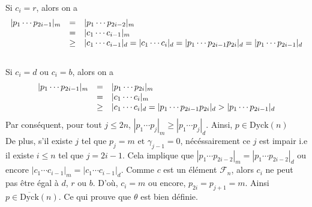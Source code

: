 \text{} \vspace{5pt}\\
Si $c_{i}=r$, alors on a \text{}\vspace{5pt}\\
\[
	\begin{array} {l l l}
		| p_{1}\cdots p_{2i-1} |_{m} & =    & | p_{1}\cdots p_{2i-2}|_{m}                                                                                                 \\
		                             & =    & | c_{1}\cdots c_{i-1} |_{m}                                                                                                 \\
		                             & \geq & | c_{1}\cdots c_{i-1} |_{d} = | c_{1}\cdots c_{i} |_{d} = | p_{1}\cdots p_{2i-1}p_{2i} |_{d} = | p_{1}\cdots p_{2i-1} |_{d}
	\end{array}
\]
\text{} \vspace{5pt}\\
Si $c_{i}=d$ ou $c_{i}=b$, alors on a \text{}\vspace{5pt}\\
\[
	\begin{array} {l l l}
		| p_{1}\cdots p_{2i-1} |_{m} & =    & | p_{1}\cdots p_{2i}|_{m}                                                                    \\
		                             & =    & | c_{1}\cdots c_{i} |_{m}                                                                    \\
		                             & \geq & | c_{1}\cdots c_{i} |_{d} =| p_{1}\cdots p_{2i-1}p_{2i} |_{d} > | p_{1}\cdots p_{2i-1} |_{d} \\
	\end{array}
\]
Par conséquent, pour tout $j\leq 2n$, $|p_{1} \cdots p_{j}|_{m}\geq |p_{1} \cdots p_{j}|_{d}$. Ainsi, $p\in \text{Dyck}(n)$\\
De plus, s'il existe $j$  tel que $p_{j}=m \text{ et } \gamma_{j-1}=0$, nécéssairement ce $j$ est impair i.e il existe $i\leq n$ tel que $j=2i-1$. Cela implique que $|p_{1} \cdots p_{2i-2}|_{m} = |p_{1} \cdots p_{2i-2}|_{d}$ ou encore $|
	c_{1} \cdots c_{i-1}|_{m} = |c_{1} \cdots c_{i-1}|_{d}$. Comme $c$ est un élément $
	\mathcal{F}_{n}$, alors $c_{i}$ ne peut pas être égal à $d$, $r$ ou $b$. D'où, $c_{i}=m$
ou encore, $p_{2i}=p_{j+1}=m$. Ainsi $p\in \overline{\text{Dyck}}(n) $. Ce qui prouve que $\theta$ est bien définie.\vspace{15pt}\\
